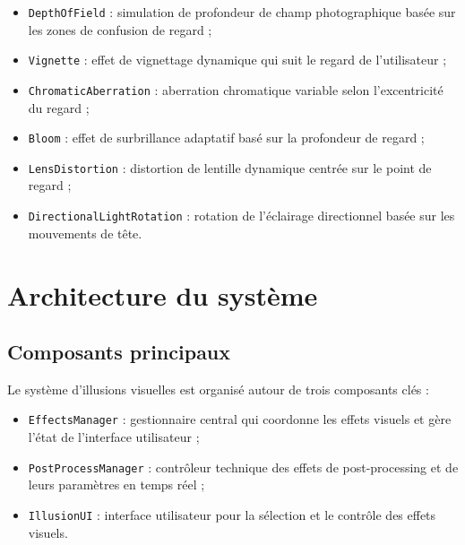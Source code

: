 \documentclass[12pt]{report}
\begin{document}
\begin{itemize}
    \vspace{2mm}
    \item \texttt{DepthOfField} : simulation de profondeur de champ photographique basée sur les zones de confusion de regard ;
    \vspace{2mm}
    \item \texttt{Vignette} : effet de vignettage dynamique qui suit le regard de l'utilisateur ;
    \vspace{2mm}
    \item \texttt{ChromaticAberration} : aberration chromatique variable selon l'excentricité du regard ;
    \vspace{2mm}
    \item \texttt{Bloom} : effet de surbrillance adaptatif basé sur la profondeur de regard ;
    \vspace{2mm}
    \item \texttt{LensDistortion} : distortion de lentille dynamique centrée sur le point de regard ;
    \vspace{2mm}
    \item \texttt{DirectionalLightRotation} : rotation de l'éclairage directionnel basée sur les mouvements de tête.
    \vspace{2mm}
\end{itemize}

\section{Architecture du système}
\subsection{Composants principaux}
Le système d'illusions visuelles est organisé autour de trois composants clés :

\begin{itemize}
    \vspace{2mm}
    \item \texttt{EffectsManager} : gestionnaire central qui coordonne les effets visuels et gère l'état de l'interface utilisateur ;
    \vspace{2mm}
    \item \texttt{PostProcessManager} : contrôleur technique des effets de post-processing et de leurs paramètres en temps réel ;
    \vspace{2mm}
    \item \texttt{IllusionUI} : interface utilisateur pour la sélection et le contrôle des effets visuels.
    \vspace{2mm}
\end{itemize}
\end{document}
